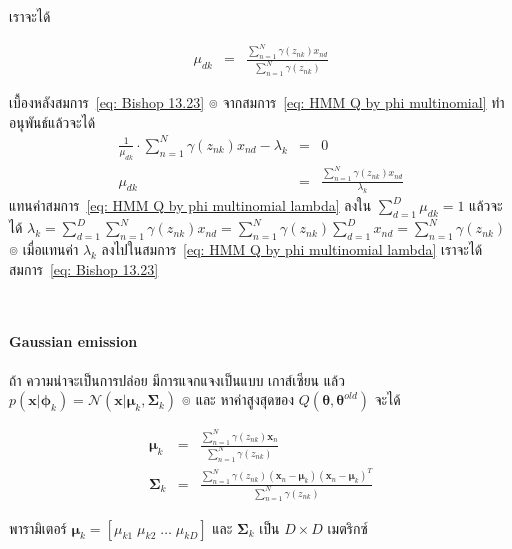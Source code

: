 เราจะได้

\begin{eqnarray}
\mu_{dk} &=& \frac{\sum_{n=1}^N \gamma (z_{nk}) x_{nd}}{\sum_{n=1}^N \gamma (z_{nk})}
\label{eq: Bishop 13.23}
\end{eqnarray}

เบื้องหลังสมการ~\ref{eq: Bishop 13.23}
๏ จากสมการ~\ref{eq: HMM Q by phi multinomial} ทำอนุพันธ์แล้วจะได้
\begin{eqnarray}
\frac{1}{\mu_{dk}} \cdot \sum_{n=1}^N \gamma (z_{nk}) x_{nd} - \lambda_k 
&=& 0
\nonumber \\
\mu_{dk} &=& \frac{\sum_{n=1}^N \gamma (z_{nk}) x_{nd}}{\lambda_k}
\label{eq: HMM Q by phi multinomial lambda}
\end{eqnarray}
แทนค่าสมการ~\ref{eq: HMM Q by phi multinomial lambda} ลงใน $\sum_{d=1}^D \mu_{dk} = 1$ แล้วจะได้ $\lambda_k = \sum_{d=1}^D \sum_{n=1}^N \gamma (z_{nk}) x_{nd} =  \sum_{n=1}^N \gamma (z_{nk}) \sum_{d=1}^D x_{nd} = \sum_{n=1}^N \gamma (z_{nk})$
๏ เมื่อแทนค่า $\lambda_k$ ลงไปในสมการ~\ref{eq: HMM Q by phi multinomial lambda} เราจะได้สมการ~\ref{eq: Bishop 13.23}

 \\

\paragraph{Gaussian emission} ถ้า ความน่าจะเป็นการปล่อย มีการแจกแจงเป็นแบบ	เกาส์เซียน แล้ว $p(\textbf{x}|\bm{\phi}_k) = \mathcal{N}(\textbf{x}|\bm{\mu}_k, \bm{\Sigma}_k)$
๏ และ หาค่าสูงสุดของ $Q(\bm{\theta}, \bm{\theta}^{old})$ จะได้

\begin{eqnarray}
\bm{\mu}_k &=& \frac{\sum_{n=1}^N \gamma (z_{nk}) \textbf{x}_n}{\sum_{n=1}^N \gamma (z_{nk})}
\label{eq: Bishop 13.20} \\
\bm{\Sigma}_k &=& \frac{\sum_{n=1}^N \gamma (z_{nk}) (\textbf{x}_n - \bm{\mu}_k)(\textbf{x}_n - \bm{\mu}_k)^T}{\sum_{n=1}^N \gamma (z_{nk})}
\label{eq: Bishop 13.21}
\end{eqnarray}

พารามิเตอร์ $\bm{\mu}_k =[\mu_{k1} \; \mu_{k2} \; \ldots \; \mu_{kD}]$ และ $\bm{\Sigma}_k$ เป็น $D \times D$ เมตริกซ์
\\


